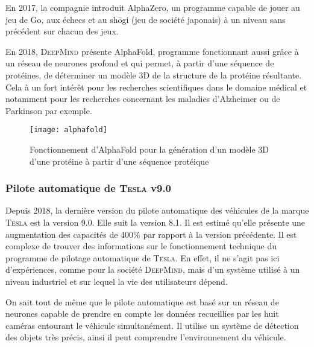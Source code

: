 En 2017, la compagnie introduit AlphaZero, un programme capable de jouer au jeu de Go, aux échecs et au shōgi (jeu de société japonais) à un niveau sans précédent sur chacun des jeux.

En 2018, \textsc{DeepMind} présente AlphaFold, programme fonctionnant aussi grâce à un réseau de neurones profond et qui permet, à partir d'une séquence de protéines, de déterminer un modèle 3D de la structure de la protéine résultante.
Cela à un fort intérêt pour les recherches scientifiques dans le domaine médical et notamment pour les recherches concernant les maladies d'Alzheimer ou de Parkinson par exemple.

\FloatBarrier
\begin{figure}[h!]
    \begin{minipage}[c]{0.55\textwidth}
        \begin{center}
            \texttt{[image: alphafold]}
        \end{center}
    \end{minipage}\hfill
    \begin{minipage}[c]{0.45\textwidth}
        \caption{Fonctionnement d'AlphaFold pour la génération d'un modèle 3D d'une protéine à partir d'une séquence protéique}
        \label{figure:alphafold}
    \end{minipage}
\end{figure}
\FloatBarrier

\subsubsection{Pilote automatique de \textsc{Tesla} v9.0}

Depuis 2018, la dernière version du pilote automatique des véhicules de la marque \textsc{Tesla} est la version 9.0.
Elle suit la version 8.1.
Il est estimé qu'elle présente une augmentation des capacités de 400\% par rapport à la version précédente.
Il est complexe de trouver des informations sur le fonctionnement technique du programme de pilotage automatique de \textsc{Tesla}.
En effet, il ne s'agit pas ici d'expériences, comme pour la société \textsc{DeepMind}, mais d'un système utilisé à un niveau industriel et sur lequel la vie des utilisateurs dépend.

On sait tout de même que le pilote automatique est basé sur un réseau de neurones capable de prendre en compte les données recueillies par les huit caméras entourant le véhicule simultanément.
Il utilise un système de détection des objets très précis, ainsi il peut comprendre l'environnement du véhicule.

